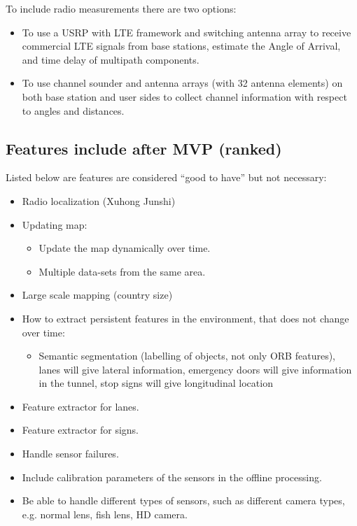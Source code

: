 To include radio measurements there are two options:
\begin{itemize}
\item To use a USRP with LTE framework and switching antenna array to
  receive commercial LTE signals from base stations, estimate the
  Angle of Arrival, and time delay of multipath components.
\item To use channel sounder and antenna arrays (with 32 antenna
  elements) on both base station and user sides to collect channel
  information with respect to angles and distances.
\end{itemize}

\subsection{Features include after MVP (ranked)}

Listed below are features are considered ``good to have'' but not
necessary:

\begin{itemize}
\item Radio localization  (Xuhong  Junshi)
\item Updating map:
  \begin{itemize}
  \item Update the map dynamically over time.
  \item Multiple data-sets from the same area.
  \end{itemize}
\item Large scale mapping (country size)
\item How to extract persistent features in the environment, that does
  not change over time:
  \begin{itemize}
  \item  Semantic segmentation (labelling of objects, not only ORB
    features), lanes will give lateral information, emergency doors
    will give information in the tunnel, stop signs will give
    longitudinal location
  \end{itemize}
\item Feature extractor for lanes.
\item Feature extractor for signs.
\item Handle sensor failures.
\item Include calibration parameters of the sensors in the offline processing.
\item Be able to handle different types of sensors, such as different camera types, e.g. normal lens, fish lens, HD camera.
\end{itemize}

